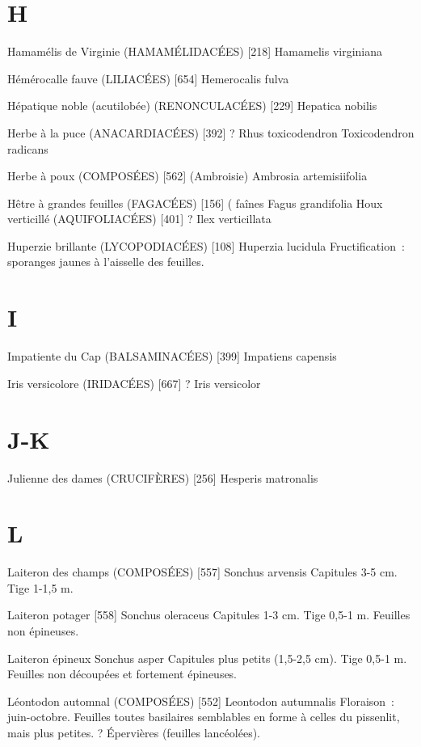 \documentclass[book,12pt,a4paper,onecolumn,openany]{memoir}
\begin{document}
\chapter*{H}

Hamamélis de Virginie (HAMAMÉLIDACÉES)  [218]
				Hamamelis virginiana

Hémérocalle fauve (LILIACÉES)  [654]
				Hemerocalis fulva

Hépatique noble (acutilobée) (RENONCULACÉES)  [229]
				Hepatica nobilis

Herbe à la puce (ANACARDIACÉES)  [392]			?
				Rhus toxicodendron
				Toxicodendron radicans

Herbe à poux (COMPOSÉES)  [562]  (Ambroisie)
				Ambrosia artemisiifolia

Hêtre à grandes feuilles (FAGACÉES)  [156]			( faînes
				Fagus grandifolia
Houx verticillé (AQUIFOLIACÉES)  [401]			?
				Ilex verticillata

Huperzie brillante (LYCOPODIACÉES)  [108]
				Huperzia lucidula
Fructification : sporanges jaunes à l’aisselle des feuilles.

\chapter*{I}

Impatiente du Cap (BALSAMINACÉES)  [399]
				Impatiens capensis

Iris versicolore (IRIDACÉES)  [667]				?
				Iris versicolor

\chapter*{J-K}

Julienne des dames (CRUCIFÈRES)  [256]
				Hesperis matronalis




\chapter*{L}

Laiteron des champs (COMPOSÉES)  [557]
				Sonchus arvensis
Capitules 3-5 cm. Tige 1-1,5 m.

Laiteron potager  [558]
				Sonchus oleraceus
Capitules 1-3 cm. Tige 0,5-1 m. Feuilles non épineuses.

Laiteron épineux
				Sonchus asper
Capitules plus petits (1,5-2,5 cm). Tige 0,5-1 m. Feuilles non découpées et fortement épineuses.

Léontodon automnal (COMPOSÉES)  [552]
				Leontodon autumnalis
Floraison : juin-octobre. Feuilles toutes basilaires semblables en forme à celles du pissenlit, mais plus petites. ? Épervières (feuilles lancéolées).
\end{document}
